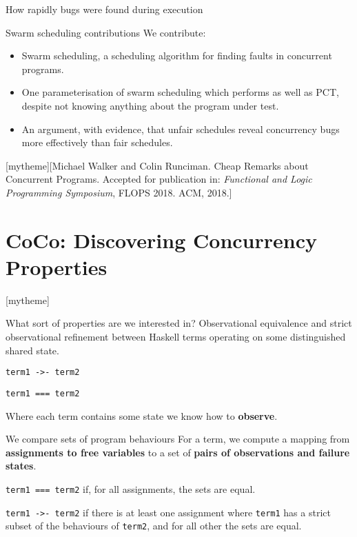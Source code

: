 \documentclass{beamer}
\newcommand{\sectiontext}[2]{%
\setbeamertemplate{section page}[mytheme][#2]%
\section{#1}%
\setbeamertemplate{section page}[mytheme]}
\begin{document}
\begin{frame}{How rapidly bugs were found during execution}
\begin{center}
  \resizebox{0.9\textwidth}{!}{}
\end{center}
\end{frame}

\begin{frame}{Swarm scheduling contributions}
  We contribute:

  \begin{itemize}
  \item Swarm scheduling, a scheduling algorithm for finding faults in
    concurrent programs.

  \item One parameterisation of swarm scheduling which performs as
    well as PCT, despite not knowing anything about the program under
    test.

  \item An argument, with evidence, that unfair schedules reveal
    concurrency bugs more effectively than fair schedules.
  \end{itemize}
\end{frame}

\sectiontext{CoCo: Discovering Concurrency Properties}{Michael Walker and Colin Runciman.  Cheap Remarks about Concurrent Programs.  Accepted for publication in: \emph{Functional and Logic Programming Symposium}, FLOPS 2018.  ACM, 2018.}

\begin{frame}{What sort of properties are we interested in?}
  Observational equivalence and strict observational refinement
  between Haskell terms operating on some distinguished shared state.

  \begin{center}
    \texttt{term1 ->- term2}

    \texttt{term1 === term2}
  \end{center}

  Where each term contains some state we know how to \textbf{observe}.
\end{frame}

\begin{frame}{We compare sets of program behaviours}
  For a term, we compute a mapping from \textbf{assignments to free
    variables} to a set of \textbf{pairs of observations and failure
    states}.

  \texttt{term1 === term2} if, for all assignments, the sets are
  equal.

  \texttt{term1 ->- term2} if there is at least one assignment where
  \texttt{term1} has a strict subset of the behaviours of
  \texttt{term2}, and for all other the sets are equal.
\end{frame}
\end{document}

